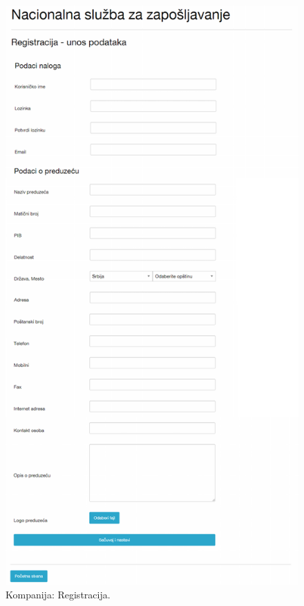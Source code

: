 \begin{figure}[H]
	\centering
	\includegraphics[height=0.95\textheight]{korisnicki-interfejs/slike/k-registracija.png}
	\caption{Kompanija: Registracija.}
	\label{for: k-registracija}
\end{figure}

